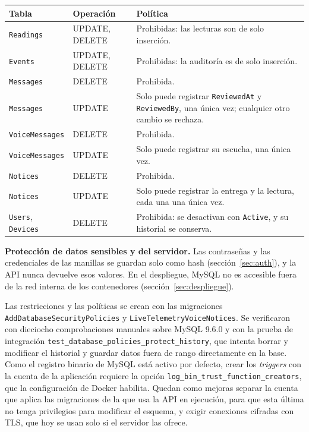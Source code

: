 \documentclass[10pt,a4paper]{article}
\newcommand{\code}[1]{{\small\urlstyle{tt}\nolinkurl{#1}}}
\begin{document}
\label{tab:politicas}
\begin{tabularx}{\linewidth}{@{}P{22mm}P{24mm}Y@{}}
\toprule\textbf{Tabla} & \textbf{Operación} & \textbf{Política}\\\midrule
\code{Readings} & UPDATE, DELETE & Prohibidas: las lecturas son de solo inserción.\\
\code{Events} & UPDATE, DELETE & Prohibidas: la auditoría es de solo inserción.\\
\code{Messages} & DELETE & Prohibida.\\
\code{Messages} & UPDATE & Solo puede registrar \code{ReviewedAt} y \code{ReviewedBy}, una única vez; cualquier otro cambio se rechaza.\\
\code{VoiceMessages} & DELETE & Prohibida.\\
\code{VoiceMessages} & UPDATE & Solo puede registrar su escucha, una única vez.\\
\code{Notices} & DELETE & Prohibida.\\
\code{Notices} & UPDATE & Solo puede registrar la entrega y la lectura, cada una una única vez.\\
\code{Users}, \code{Devices} & DELETE & Prohibida: se desactivan con \code{Active}, y su historial se conserva.\\\bottomrule
\end{tabularx}

\textbf{Protección de datos sensibles y del servidor.} Las contraseñas y las credenciales de las manillas se guardan solo como hash (sección~\ref{sec:auth}), y la API nunca devuelve esos valores. En el despliegue, MySQL no es accesible fuera de la red interna de los contenedores (sección~\ref{sec:despliegue}).

Las restricciones y las políticas se crean con las migraciones \code{AddDatabaseSecurityPolicies} y \code{LiveTelemetryVoiceNotices}. Se verificaron con dieciocho comprobaciones manuales sobre MySQL 9.6.0 y con la prueba de integración \code{test_database_policies_protect_history}, que intenta borrar y modificar el historial y guardar datos fuera de rango directamente en la base. Como el registro binario de MySQL está activo por defecto, crear los \emph{triggers} con la cuenta de la aplicación requiere la opción \code{log_bin_trust_function_creators}, que la configuración de Docker habilita. Quedan como mejoras separar la cuenta que aplica las migraciones de la que usa la API en ejecución, para que esta última no tenga privilegios para modificar el esquema, y exigir conexiones cifradas con TLS, que hoy se usan solo si el servidor las ofrece.
\end{document}
